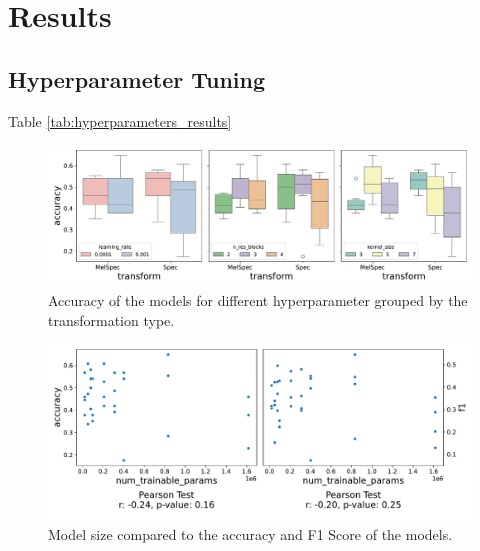 


\section{Results}
\label{section3}

\subsection{Hyperparameter Tuning}

Table \ref{tab:hyperparameters_results}

\begin{figure}[h!]
    \centering
    \captionsetup{width=.7\linewidth}
    \includegraphics[width=1\textwidth]{figures/hyperparameters_boxplot.pdf}
    \caption{Accuracy of the models for different hyperparameter grouped by the transformation type.}
    \label{fig:hyperparameters_boxplot}
\end{figure}

\begin{figure}[h!]
    \centering
    \captionsetup{width=.7\linewidth}
    \includegraphics[width=1\textwidth]{figures/hyperparameters_scatterplot.pdf}
    \caption{Model size compared to the accuracy and F1 Score of the models.}
    \label{fig:hyperparameters_scatterplot}
\end{figure}

